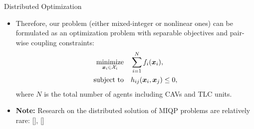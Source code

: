 \documentclass[9pt]{beamer}
\begin{document}




\begin{frame}{Distributed Optimization}
\begin{itemize}
\item Therefore, our problem (either mixed-integer or nonlinear ones) can be formulated as an optimization problem with separable objectives and pair-wise coupling constraints:
\begin{equation*}
\begin{split}
\underset{\boldsymbol{x}_i \in \mathcal{X}_i}{\operatorname*{minimize}} & \quad \sum_{i=1}^{N} f_i (\boldsymbol{x}_i), \\
\text{subject to} & \quad h_{ij} (\boldsymbol{x}_i, \boldsymbol{x}_j) \le 0,
\end{split}
\end{equation*}
where $N$ is the total number of agents including CAVs and TLC units.


\item \textbf{Note:} Research on the distributed solution of MIQP problems are relatively rare: [\cite{takapoui2020simple}], [\cite{liu2021distributed}]

\end{itemize}
\end{frame}
\end{document}
